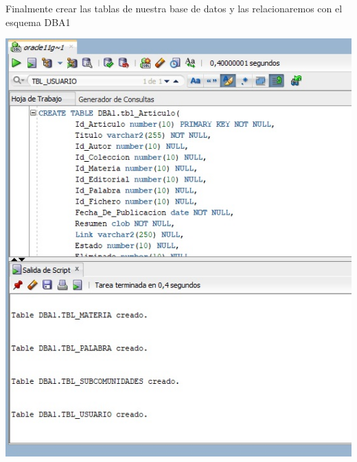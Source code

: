 \begin{flushleft}
\begin{center}
\end{center}
Finalmente crear las tablas de nuestra base de datos y las relacionaremos con el esquema DBA1\\
\begin{center}
\includegraphics{images/image-34}\\
\end{center}
\end{flushleft}